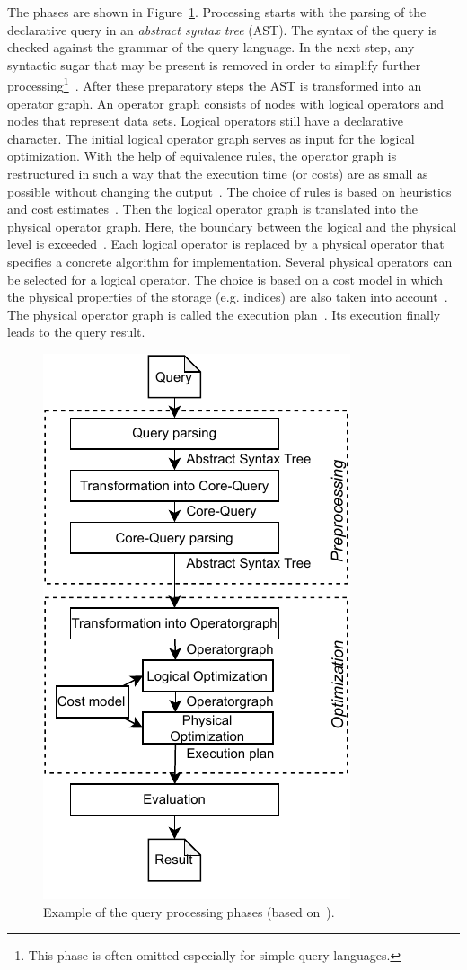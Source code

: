 \documentclass[english,version-2019-11]{uzl-thesis}
\begin{document}
The phases are shown in Figure~\ref{queryProcessingPhases}. Processing starts with the parsing of the declarative query in an \emph{abstract syntax tree} (AST). The syntax of the query is checked against the grammar of the query language. In the next step, any syntactic sugar that may be present is removed in order to simplify further processing\footnote{This phase is often omitted especially for simple query languages.}~\cite{SWBook}. After these preparatory steps the AST is transformed into an operator graph.
An operator graph consists of nodes with logical operators and nodes that represent data sets. Logical operators still have a declarative character. The initial logical operator graph serves as input for the logical optimization. With the help of equivalence rules, the operator graph is restructured in such a way that the execution time (or costs) are as small as possible without changing the output~\cite{SWBook}. The choice of rules is based on heuristics and cost estimates~\cite{Kemper}.
Then the logical operator graph is translated into the physical operator graph. Here, the boundary between the logical and the physical level is exceeded~\cite{Kemper}. Each logical operator is replaced by a physical operator that specifies a concrete algorithm for implementation. Several physical operators can be selected for a logical operator. The choice is based on a cost model in which the physical properties of the storage (e.g. indices) are also taken into account~\cite{Kemper}. The physical operator graph is called the execution plan~\cite{SWBook}. Its execution finally leads to the query result.
\begin{figure}[htpb]
  \centering
  \includegraphics{queryProcessingPhases.pdf}
  \caption{Example of the query processing phases (based on~\cite{SWBook}).}
  \label{queryProcessingPhases}
\end{figure}
\end{document}
